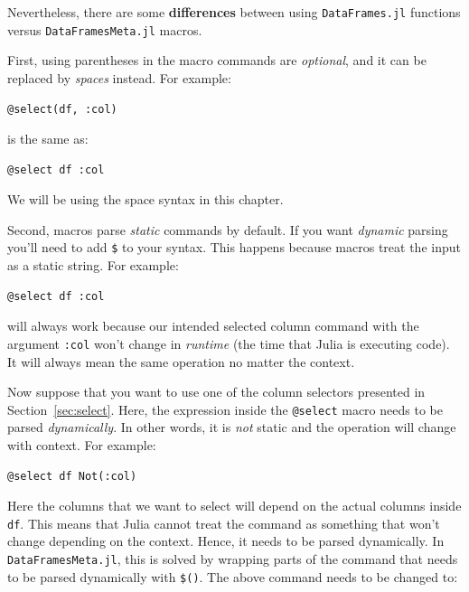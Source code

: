 \documentclass[
  notoc %
]{tufte-book}
\newcommand{\passthrough}[1]{#1}
\begin{document}
Nevertheless, there are some \textbf{differences} between using
\passthrough{\lstinline!DataFrames.jl!} functions versus
\passthrough{\lstinline!DataFramesMeta.jl!} macros.

First, using parentheses in the macro commands are \emph{optional}, and
it can be replaced by \emph{spaces} instead. For example:

\begin{lstlisting}
@select(df, :col)
\end{lstlisting}

is the same as:

\begin{lstlisting}
@select df :col
\end{lstlisting}

We will be using the space syntax in this chapter.

Second, macros parse \emph{static} commands by default. If you want
\emph{dynamic} parsing you'll need to add \passthrough{\lstinline!$!} to
your syntax. This happens because macros treat the input as a static
string. For example:

\begin{lstlisting}
@select df :col
\end{lstlisting}

will always work because our intended selected column command with the
argument \passthrough{\lstinline!:col!} won't change in \emph{runtime}
(the time that Julia is executing code). It will always mean the same
operation no matter the context.

Now suppose that you want to use one of the column selectors presented
in Section~\ref{sec:select}. Here, the expression inside the
\passthrough{\lstinline!@select!} macro needs to be parsed
\emph{dynamically}. In other words, it is \emph{not} static and the
operation will change with context. For example:

\begin{lstlisting}
@select df Not(:col)
\end{lstlisting}

Here the columns that we want to select will depend on the actual
columns inside \passthrough{\lstinline!df!}. This means that Julia
cannot treat the command as something that won't change depending on the
context. Hence, it needs to be parsed dynamically. In
\passthrough{\lstinline!DataFramesMeta.jl!}, this is solved by wrapping
parts of the command that needs to be parsed dynamically with
\passthrough{\lstinline!$()!}. The above command needs to be changed to:
\end{document}
